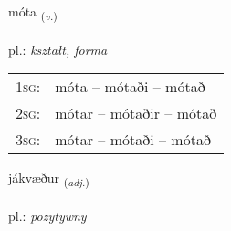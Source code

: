 \documentclass[frontgrid, backgrid]{flacards}\usepackage[]{graphicx}\usepackage[]{xcolor}
\begin{document}
\renewcommand{\flhead}{\vskip5pt \fboxsep=0pt {\small\bfseries\footnotesize Sagnorð | czasownik}}
\renewcommand{\fcfoot}{\vskip5pt \fboxsep=0pt \hspace{2pt}{\small\bfseries\footnotesize 1K}}

\renewcommand{\blhead}{\vskip5pt {\small\bfseries\footnotesize Sagnorð | czasownik }}
\renewcommand{\bcfoot}{\vskip5pt \hspace{2pt}{\small\bfseries\footnotesize 1K}}


{móta \small{\textsubscript{(\textit{v.})}} \\[1ex] %
\textphonetic{[mouːta]} \\
pl.: \emph{kształt, forma} \\  [2ex]
\renewcommand*{\arraystretch}{0.8}
\begin{tabular}{p{1cm}l}
\textsc{1sg}: & móta -- mótaði -- mótað \\ 
\textsc{2sg}: & mótar -- mótaðir -- mótað \\ 
\textsc{3sg}: & mótar -- mótaði -- mótað \\ 
\end{tabular}
}

\renewcommand{\flhead}{\vskip5pt \fboxsep=0pt {\small\bfseries\footnotesize Lýsingarorð | przymiotnik}}
\renewcommand{\fcfoot}{\vskip5pt \fboxsep=0pt \hspace{2pt}{\small\bfseries\footnotesize 1K}}

\renewcommand{\blhead}{\vskip5pt {\small\bfseries\footnotesize Lýsingarorð | przymiotnik }}
\renewcommand{\bcfoot}{\vskip5pt \hspace{2pt}{\small\bfseries\footnotesize 1K}}


{jákvæður \small{\textsubscript{(\textit{adj.})}} \\[1ex] %
\textphonetic{[jauːkʰvaiðʏr]} \\
pl.: \emph{pozytywny} \\  [2ex]
\renewcommand*{\arraystretch}{0.8}
}
\end{document}
